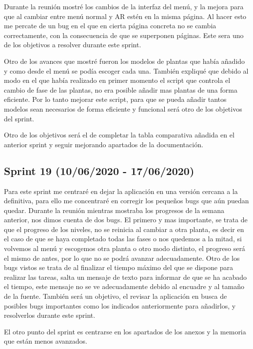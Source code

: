  Durante la reunión mostré los cambios de la interfaz del menú, y la mejora para que al cambiar entre menú normal y AR estén en la misma página. Al hacer esto me percate de un bug en el que en cierta página concreta no se cambia correctamente, con la consecuencia de que se superponen páginas. Este sera uno de los objetivos a resolver durante este sprint.
 
 Otro de los avances que mostré fueron los modelos de plantas que había añadido y como desde el menú se podía escoger cada una.  También expliqué que debido al modo en el que había realizado en primer momento el script que controla el cambio de fase de las plantas, no era posible añadir mas plantas de una forma eficiente. Por lo tanto mejorar este script, para que se pueda añadir tantos modelos sean necesarios de forma eficiente y funcional será otro de los objetivos del sprint.
 
Otro de los objetivos será el de completar la tabla comparativa añadida en el anterior sprint y seguir mejorando apartados de la documentación.
 
\subsection{Sprint 19 (10/06/2020 - 17/06/2020)}

 Para este sprint me centraré en dejar la aplicación en una versión cercana a la definitiva, para ello me concentraré en corregir los pequeños bugs que aún puedan quedar. Durante la reunión mientras mostraba los progresos de la semana anterior, nos dimos cuenta de dos bugs. El primero y mas importante, se trata de que el progreso de los niveles, no se reinicia al cambiar a otra planta, es decir en el caso de que se haya completado todas las fases o nos quedemos a la mitad, si volvemos al menú y escogemos otra planta o otro modo distinto, el progreso será el mismo de antes, por lo que no se podrá avanzar adecuadamente. Otro de los bugs vistos se trata de al finalizar el tiempo máximo del que se dispone para realizar las tareas, salta un mensaje de texto para informar de que se ha acabado el tiempo, este mensaje no se ve adecuadamente debido al encuadre y al tamaño de la fuente. También será un objetivo, el revisar la aplicación en busca de posibles bugs importantes como los indicados anteriormente para añadirlos, y resolverlos durante este sprint.
 
 El otro punto del sprint es centrarse en los apartados de los anexos y la memoria que están menos avanzados.
 
